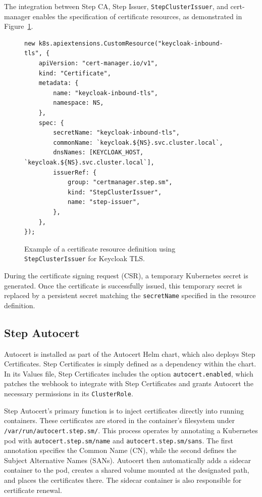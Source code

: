 The integration between Step CA, Step Issuer, \texttt{StepClusterIssuer}, and cert-manager enables the specification of certificate resources, as demonstrated in Figure~\ref{fig:certificate_resource}.

\begin{figure}[h]
    \centering
\begin{verbatim}
new k8s.apiextensions.CustomResource("keycloak-inbound-tls", {
    apiVersion: "cert-manager.io/v1",
    kind: "Certificate",
    metadata: {
        name: "keycloak-inbound-tls",
        namespace: NS,
    },
    spec: {
        secretName: "keycloak-inbound-tls",
        commonName: `keycloak.${NS}.svc.cluster.local`,
        dnsNames: [KEYCLOAK_HOST, `keycloak.${NS}.svc.cluster.local`],
        issuerRef: {
            group: "certmanager.step.sm",
            kind: "StepClusterIssuer",
            name: "step-issuer",
        },
    },
});  
\end{verbatim}
    \caption{Example of a certificate resource definition using \texttt{StepClusterIssuer} for Keycloak TLS.}
    \label{fig:certificate_resource}
\end{figure}

During the certificate signing request (CSR), a temporary Kubernetes secret is generated. Once the certificate is successfully issued, this temporary secret is replaced by a persistent secret matching the \texttt{secretName} specified in the resource definition.

\subsection{Step Autocert}
Autocert is installed as part of the Autocert Helm chart, which also deploys Step Certificates. Step Certificates is simply defined as a dependency within the chart. In its Values file, Step Certificates includes the option \texttt{autocert.enabled}, which patches the webhook to integrate with Step Certificates and grants Autocert the necessary permissions in its \texttt{ClusterRole}.

Step Autocert's primary function is to inject certificates directly into running containers. These certificates are stored in the container's filesystem under \texttt{/var/run/autocert.step.sm/}. This process operates by annotating a Kubernetes pod with \texttt{autocert.step.sm/name} and \texttt{autocert.step.sm/sans}. The first annotation specifies the Common Name (CN), while the second defines the Subject Alternative Names (SANs). Autocert then automatically adds a sidecar container to the pod, creates a shared volume mounted at the designated path, and places the certificates there. The sidecar container is also responsible for certificate renewal.


